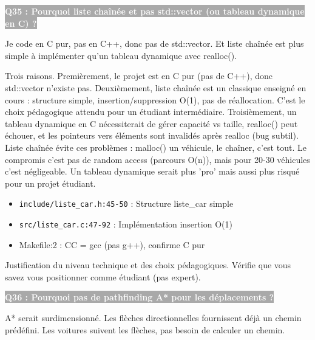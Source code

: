 \documentclass[12pt,a4paper]{article}
\newcommand{\question}[1]{%
    \vspace{0.5cm}
    \noindent\colorbox{darkgray}{\textcolor{white}{\textbf{#1}}}
    \vspace{0.3cm}
}
\begin{document}
\question{Q35 : Pourquoi liste chaînée et pas std::vector (ou tableau dynamique en C) ?}

\begin{reponse_courte}
Je code en C pur, pas en C++, donc pas de std::vector. Et liste chaînée est plus simple à implémenter qu'un tableau dynamique avec realloc().
\end{reponse_courte}

\begin{reponse_longue}
Trois raisons. Premièrement, le projet est en C pur (pas de C++), donc std::vector n'existe pas. Deuxièmement, liste chaînée est un classique enseigné en cours : structure simple, insertion/suppression O(1), pas de réallocation. C'est le choix pédagogique attendu pour un étudiant intermédiaire. Troisièmement, un tableau dynamique en C nécessiterait de gérer capacité vs taille, realloc() peut échouer, et les pointeurs vers éléments sont invalidés après realloc (bug subtil). Liste chaînée évite ces problèmes : malloc() un véhicule, le chaîner, c'est tout. Le compromis c'est pas de random access (parcours O(n)), mais pour 20-30 véhicules c'est négligeable. Un tableau dynamique serait plus 'pro' mais aussi plus risqué pour un projet étudiant.
\end{reponse_longue}

\begin{reference_code}
\begin{itemize}
    \item \texttt{include/liste\_car.h:45-50} : Structure liste\_car simple
    \item \texttt{src/liste\_car.c:47-92} : Implémentation insertion O(1)
    \item Makefile:2 : CC = gcc (pas g++), confirme C pur
\end{itemize}
\end{reference_code}

\begin{objectif_prof}
Justification du niveau technique et des choix pédagogiques. Vérifie que vous savez vous positionner comme étudiant (pas expert).
\end{objectif_prof}

\question{Q36 : Pourquoi pas de pathfinding A* pour les déplacements ?}

\begin{reponse_courte}
A* serait surdimensionné. Les flèches directionnelles fournissent déjà un chemin prédéfini. Les voitures suivent les flèches, pas besoin de calculer un chemin.
\end{reponse_courte}
\end{document}
